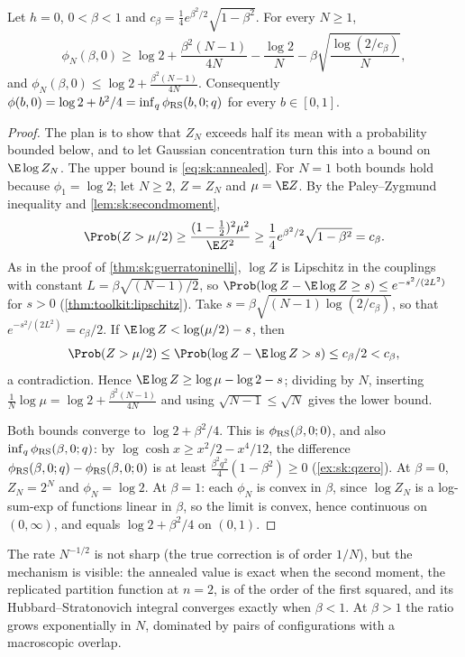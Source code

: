 \begin{refsection}
\begin{theorem}\label{thm:sk:hightemp}
Let $h=0$, $0<\beta<1$ and $c_\beta=\frac14e^{\beta^2/2}\sqrt{1-\beta^2}$. For every $N\ge1$,
\[
\phi_N(\beta,0)\ge\log2+\frac{\beta^2(N-1)}{4N}-\frac{\log2}N-\beta\sqrt{\frac{\log(2/c_\beta)}N},
\]
and $\phi_N(\beta,0)\le\log2+\frac{\beta^2(N-1)}{4N}$. Consequently $\phi(b,0)=\log2+b^2/4=\inf_q\phi_{\mathrm{RS}}(b,0;q)$ for every $b\in[0,1]$.
\end{theorem}

\begin{proof}
The plan is to show that $Z_N$ exceeds half its mean with a probability bounded below, and to let Gaussian concentration turn this into a bound on $\E\log Z_N$. The upper bound is \eqref{eq:sk:annealed}. For $N=1$ both bounds hold because $\phi_1=\log2$; let $N\ge2$, $Z=Z_N$ and $\mu=\E Z$. By the Paley--Zygmund inequality and \cref{lem:sk:secondmoment},
\[
\Prob(Z>\mu/2)\ge\frac{(1-\frac12)^2\mu^2}{\E Z^2}\ge\frac14e^{\beta^2/2}\sqrt{1-\beta^2}=c_\beta .
\]
As in the proof of \cref{thm:sk:guerratoninelli}, $\log Z$ is Lipschitz in the couplings with constant $L=\beta\sqrt{(N-1)/2}$, so $\Prob(\log Z-\E\log Z\ge s)\le e^{-s^2/(2L^2)}$ for $s>0$ (\cref{thm:toolkit:lipschitz}). Take $s=\beta\sqrt{(N-1)\log(2/c_\beta)}$, so that $e^{-s^2/(2L^2)}=c_\beta/2$. If $\E\log Z<\log(\mu/2)-s$, then
\[
\Prob(Z>\mu/2)\le\Prob(\log Z-\E\log Z>s)\le c_\beta/2<c_\beta,
\]
a contradiction. Hence $\E\log Z\ge\log\mu-\log2-s$; dividing by $N$, inserting $\frac1N\log\mu=\log2+\frac{\beta^2(N-1)}{4N}$ and using $\sqrt{N-1}\le\sqrt N$ gives the lower bound.

Both bounds converge to $\log2+\beta^2/4$. This is $\phi_{\mathrm{RS}}(\beta,0;0)$, and also $\inf_q\phi_{\mathrm{RS}}(\beta,0;q)$: by $\log\cosh x\ge x^2/2-x^4/12$, the difference $\phi_{\mathrm{RS}}(\beta,0;q)-\phi_{\mathrm{RS}}(\beta,0;0)$ is at least $\frac{\beta^2q^2}4(1-\beta^2)\ge0$ (\cref{ex:sk:qzero}). At $\beta=0$, $Z_N=2^N$ and $\phi_N=\log2$. At $\beta=1$: each $\phi_N$ is convex in $\beta$, since $\log Z_N$ is a log-sum-exp of functions linear in $\beta$, so the limit is convex, hence continuous on $(0,\infty)$, and equals $\log2+\beta^2/4$ on $(0,1)$.
\end{proof}

The rate $N^{-1/2}$ is not sharp (the true correction is of order $1/N$), but the mechanism is visible: the annealed value is exact when the second moment, the replicated partition function at $n=2$, is of the order of the first squared, and its Hubbard--Stratonovich integral converges exactly when $\beta<1$. At $\beta>1$ the ratio grows exponentially in $N$, dominated by pairs of configurations with a macroscopic overlap.


\end{refsection}
